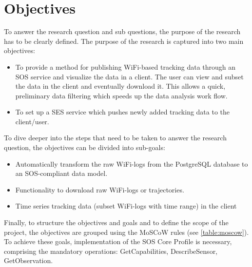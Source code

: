 \section{Objectives}
To answer the research question and sub questions, the purpose of the research has to be clearly defined. The purpose of the research is captured into two main objectives:
\begin{itemize}
\item To provide a method for publishing WiFi-based tracking data through an SOS service and visualize the data in a client. The user can view and subset the data in the client and eventually download it. This allows a quick, preliminary data filtering which speeds up the data analysis work flow.
\item To set up a SES service which pushes newly added tracking data to the client/user.
\end{itemize}
To dive deeper into the steps that need to be taken to answer the research question, the objectives can be divided into sub-goals:\\
\begin{itemize}
\item Automatically transform the raw WiFi-logs from the PostgreSQL database to an SOS-compliant data model.
\item Functionality to download raw WiFi-logs or trajectories.
\item Time series tracking data (subset WiFi-logs with time range) in the client
\end{itemize}
Finally, to structure the objectives and goals and to define the scope of the project, the objectives are grouped using the MoSCoW rules (see \autoref{table:moscow}). To achieve these goals, implementation of the SOS Core Profile is necessary, comprising the mandatory operations: GetCapabilities, DescribeSensor, GetObservation.\\
